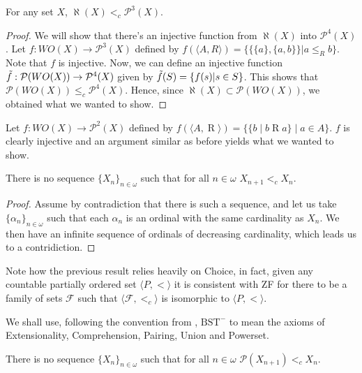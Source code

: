 \documentclass{article}
\begin{document}
\begin{theorem}
	For any set $X$, $\aleph(X)<_c \mathcal{P}^3(X)$.
\end{theorem}
\begin{proof}
	We will show that there's an injective function from $\aleph(X)$ into $\mathcal{P}^4(X)$. Let $f:WO(X)\rightarrow \mathcal{P}^3(X)$ defined by $f(\langle A,R\rangle) = \{\{\{a\},\{a,b\}\}| a\leq_R b\}$. Note that $f$ is injective. Now, we can define an injective function $\Tilde{f}: \mathcal{P} (WO(X)) \rightarrow \mathcal{P}^4(X)$ given by $\Tilde{f}(S) = \{f(s) | s\in S\}$. This shows that $\mathcal{P} (WO(X)) \leq_c \mathcal{P}^4(X)$. Hence, since $\aleph (X) \subset \mathcal{P} (WO(X))$, we obtained what we wanted to show.
\end{proof}

Let $f:WO(X)\rightarrow \mathcal{P}^2(X)$ defined by $f(\langle A,\mathrel{R}\rangle) = \{\{b\mid b \mathrel{R} a\} \mid a\in A\}$. $f$ is clearly injective and an argument similar as before yields what we wanted to show.


\begin{theorem}[ZFC]
	There is no sequence $\{X_n\}_{n\in\omega}$ such that for all $n\in\omega$ $X_{n+1} <_c X_n$.
\end{theorem}
\begin{proof}
	Assume by contradiction that there is such a sequence, and let us take $\{\alpha_n\}_{n\in\omega}$ such that each $\alpha_n$ is an ordinal with the same cardinality as $X_n$. We then have an infinite sequence of ordinals of decreasing cardinality, which leads us to a contridiction.
\end{proof}

Note how the previous result relies heavily on Choice, in fact, given any countable partially ordered set $\langle P,< \rangle$ it is consistent with ZF for there to be a family of sets $\mathcal{F}$ such that $\langle \mathcal{F},<_c\rangle$ is isomorphic to $\langle P,< \rangle$.

We shall use, following the convention from \cite[Def. I.3.1]{Kunen}, $\text{BST}^{-}$ to mean the axioms of Extensionality, Comprehension, Pairing, Union and Powerset.

\begin{theorem}
	There is no sequence $\{X_n\}_{n\in\omega}$ such that for all $n\in\omega$ $\mathcal{P}(X_{n+1}) <_c X_n$.
\end{theorem}
\end{document}
